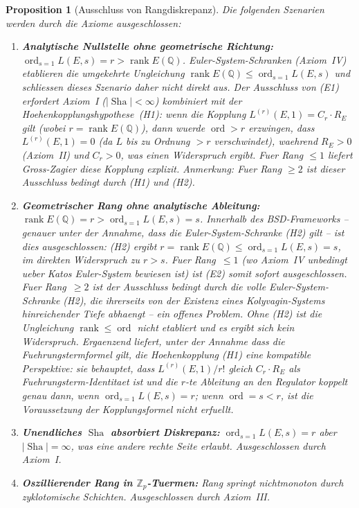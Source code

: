 \documentclass[aps,prd,twocolumn,superscriptaddress,nofootinbib]{revtex4-2}
\newtheorem{proposition}[theorem]{Proposition}
\theoremstyle{definition}
\theoremstyle{remark}
\DeclareMathOperator{\ord}{ord}
\DeclareMathOperator{\rank}{rank}
\DeclareMathOperator{\Sha}{Sha}
\begin{document}
\begin{proposition}[Ausschluss von Rangdiskrepanz]
\label{prop:exclusion}
Die folgenden Szenarien werden durch die Axiome ausgeschlossen:

\begin{enumerate}
\item[\textbf{(E1)}] \textbf{Analytische Nullstelle ohne geometrische Richtung:} $\ord_{s=1} L(E,s) = r > \rank E(\mathbb{Q})$. Euler-System-Schranken (Axiom~IV) etablieren die \textit{umgekehrte} Ungleichung $\rank E(\mathbb{Q}) \leq \ord_{s=1} L(E,s)$ und schliessen dieses Szenario daher nicht direkt aus. Der Ausschluss von (E1) erfordert Axiom~I ($|\Sha| < \infty$) kombiniert mit der Hoehenkopplungshypothese~(H1): wenn die Kopplung $L^{(r)}(E,1) = C_r \cdot R_E$ gilt (wobei $r = \rank E(\mathbb{Q})$), dann wuerde $\ord > r$ erzwingen, dass $L^{(r)}(E,1) = 0$ (da $L$ bis zu Ordnung $> r$ verschwindet), waehrend $R_E > 0$ (Axiom~II) und $C_r > 0$, was einen Widerspruch ergibt. Fuer Rang $\leq 1$ liefert Gross-Zagier diese Kopplung explizit. \textit{Anmerkung:} Fuer Rang $\geq 2$ ist dieser Ausschluss bedingt durch (H1) und (H2).

\item[\textbf{(E2)}] \textbf{Geometrischer Rang ohne analytische Ableitung:} $\rank E(\mathbb{Q}) = r > \ord_{s=1} L(E,s) = s$. \textit{Innerhalb des BSD-Frameworks} -- genauer unter der Annahme, dass die Euler-System-Schranke (H2) gilt -- ist dies ausgeschlossen: (H2) ergibt $r = \rank E(\mathbb{Q}) \leq \ord_{s=1} L(E,s) = s$, im direkten Widerspruch zu $r > s$. Fuer Rang~$\leq 1$ (wo Axiom~IV unbedingt ueber Katos Euler-System bewiesen ist) ist (E2) somit sofort ausgeschlossen. Fuer Rang~$\geq 2$ ist der Ausschluss bedingt durch die volle Euler-System-Schranke (H2), die ihrerseits von der Existenz eines Kolyvagin-Systems hinreichender Tiefe abhaengt -- ein offenes Problem. Ohne (H2) ist die Ungleichung $\rank \leq \ord$ nicht etabliert und es ergibt sich kein Widerspruch. Ergaenzend liefert, unter der Annahme dass die Fuehrungstermformel gilt, die Hoehenkopplung (H1) eine kompatible Perspektive: sie behauptet, dass $L^{(r)}(E,1)/r!$ gleich $C_r \cdot R_E$ als \textit{Fuehrungsterm-Identitaet} ist und die $r$-te Ableitung an den Regulator koppelt genau dann, wenn $\ord_{s=1} L(E,s) = r$; wenn $\ord = s < r$, ist die Voraussetzung der Kopplungsformel nicht erfuellt.

\item[\textbf{(E3)}] \textbf{Unendliches $\Sha$ absorbiert Diskrepanz:} $\ord_{s=1} L(E,s) = r$ aber $|\Sha| = \infty$, was eine andere rechte Seite erlaubt. Ausgeschlossen durch Axiom~I.

\item[\textbf{(E4)}] \textbf{Oszillierender Rang in $\mathbb{Z}_p$-Tuermen:} Rang springt nichtmonoton durch zyklotomische Schichten. Ausgeschlossen durch Axiom~III.
\end{enumerate}
\end{proposition}
\end{document}
